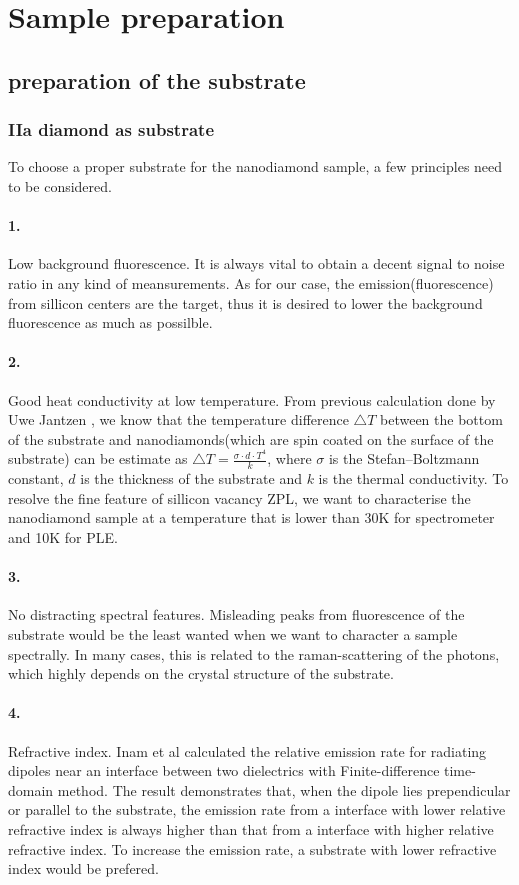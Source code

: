 \section[Sample preparation]{Sample preparation}
\subsection{preparation of the substrate}
\subsubsection{IIa diamond as substrate}

To choose a proper substrate for the nanodiamond sample, a few principles need to be considered.

\paragraph{1.}Low background fluorescence. 
It is always vital to obtain a decent signal to noise ratio in any kind of meansurements. As for our case, the emission(fluorescence) from sillicon centers are the target, thus it is desired to lower the background fluorescence as much as possilble.
\paragraph{2.}Good heat conductivity at low temperature.
From previous calculation done by Uwe Jantzen \citep{jantzen_low_2015}, we know that the temperature difference $\bigtriangleup T$ between the bottom of the substrate and nanodiamonds(which are spin coated on the surface of the substrate) can be estimate as\newline
$\bigtriangleup T = \frac{\sigma \cdot d \cdot T^{4}}{k} $,
where $\sigma$ is the Stefan–Boltzmann constant, $d$ is the thickness of the substrate and $k$ is the thermal conductivity.
To resolve the fine feature of sillicon vacancy ZPL, we want to characterise the nanodiamond sample at a temperature that is lower than 30K for spectrometer and 10K for PLE.
\paragraph{3.} No distracting spectral features.
Misleading peaks from fluorescence of the substrate would be the least wanted when we want to character a sample spectrally. In many cases, this is related to the raman-scattering of the photons, which highly depends on the crystal structure of the substrate. 
\paragraph{4.}Refractive index. Inam et al calculated the relative emission rate for radiating dipoles near an interface between two dielectrics with Finite-difference time-domain method. \citep{inam_modification_2011} The result demonstrates that, when the dipole lies prependicular or parallel to the substrate, the emission rate from a interface with lower relative refractive index is always higher than that from a interface with higher relative refractive index. To increase the emission rate, a substrate with lower refractive index would be prefered.

